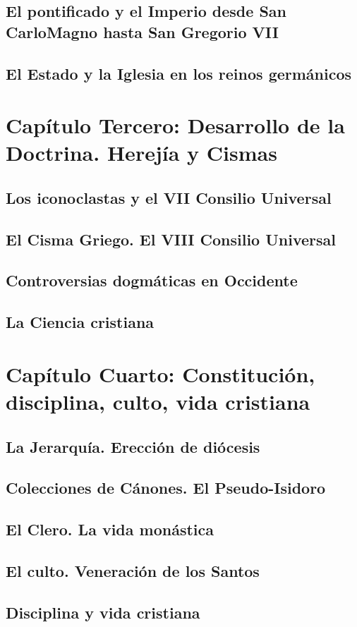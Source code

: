 \raggedbottom{} \documentclass[12pt, a4paper]{book}
\begin{document}
\section{El pontificado y el Imperio desde San CarloMagno hasta San Gregorio VII}
\section{El Estado y la Iglesia en los reinos germánicos}
\chapter{Capítulo Tercero: Desarrollo de la Doctrina. Herejía y Cismas}
\section{Los iconoclastas y el VII Consilio Universal}
\section{El Cisma Griego. El VIII Consilio Universal}
\section{Controversias dogmáticas en Occidente}
\section{La Ciencia cristiana}
\chapter{Capítulo Cuarto: Constitución, disciplina, culto, vida cristiana}
\section{La Jerarquía. Erección de diócesis}
\section{Colecciones de Cánones. El Pseudo-Isidoro}
\section{El Clero. La vida monástica}
\section{El culto. Veneración de los Santos}
\section{Disciplina y vida cristiana}
\end{document}
